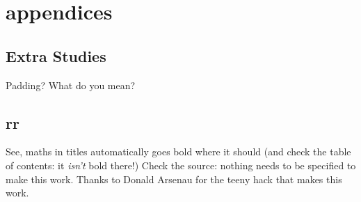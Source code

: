 \chapter{appendices}
\label{app:Pointless}





\section{Extra Studies}
\label{sec:ExtraStudies}
Padding? What do you mean?

\section{rr}
\label{sec:EqnTitle}
See, maths in titles automatically goes bold where it should (and check the 
table of contents: it \emph{isn't} bold there!) Check the source: nothing
needs to be specified to make this work. Thanks to Donald Arsenau for the
teeny hack that makes this work.

%
